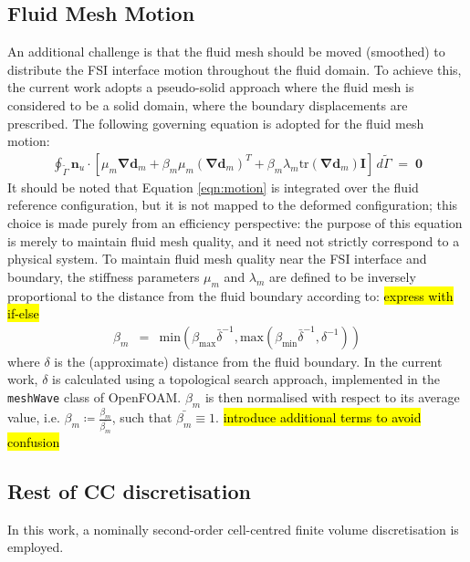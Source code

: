 \documentclass[sn-mathphys,Numbered]{sn-jnl}%
\newcommand{\bb}{\boldsymbol}
\begin{document}
\subsection{Fluid Mesh Motion}
An additional challenge is that the fluid mesh should be moved (smoothed) to distribute the FSI interface motion throughout the fluid domain.
To achieve this, the current work adopts a pseudo-solid approach where the fluid mesh is considered to be a solid domain, where the boundary displacements are prescribed.
The following governing equation is adopted for the fluid mesh motion:
\begin{eqnarray} \label{eqn:motion}
    \oint_{\tilde{\Gamma}}
    \bb{n}_u \cdot \left[ \mu_m \bb{\nabla}\bb{d}_m
    + \beta_m \mu_m (\bb{\nabla}\bb{d}_m)^T
    + \beta_m \lambda_m \text{tr}(\bb{\nabla} \bb{d}_m)\textbf{I} \right] 
    \, d\tilde{\Gamma}
    \;=\; \bb{0}
\end{eqnarray}
It should be noted that Equation \ref{eqn:motion} is integrated over the fluid reference configuration, but it is not mapped to the deformed configuration; this choice is made purely from an efficiency perspective: the purpose of this equation is merely to maintain fluid mesh quality, and it need not strictly correspond to a physical system.
To maintain fluid mesh quality near the FSI interface and boundary, the stiffness parameters $\mu_m$ and $\lambda_m$ are defined to be inversely proportional to the distance from the fluid boundary according to:
\hl{express with if-else}
\begin{eqnarray}
	\beta_m &=& \text{min}(\beta_\text{max} \bar{\delta}^{-1}, \text{max}(\beta_\text{min} \bar{\delta}^{-1}, \delta^{-1}))
\end{eqnarray}
where $\delta$ is the (approximate) distance from the fluid boundary.
In the current work, $\delta$ is calculated using a topological search approach, implemented in the \texttt{meshWave} class of OpenFOAM.
$\beta_m$ is then normalised with respect to its average value, i.e. $\beta_m \coloneqq \frac{\beta_m}{\bar{\beta_m}}$, such that $\bar{\beta_m} \equiv 1$. \hl{introduce additional terms to avoid confusion}


\subsection{Rest of CC discretisation}

In this work, a nominally second-order cell-centred finite volume discretisation is employed.
\end{document}
